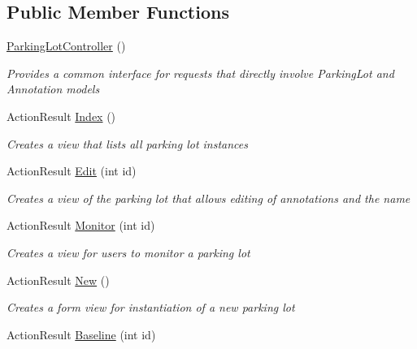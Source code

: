 \subsection*{Public Member Functions}
\begin{DoxyCompactItemize}
\item 
\mbox{\hyperlink{class_eagle_eye_1_1_controllers_1_1_parking_lot_controller_a6cb8c923ba943aca4683d60d1585806d}{Parking\+Lot\+Controller}} ()
\begin{DoxyCompactList}\small\item\em Provides a common interface for requests that directly involve Parking\+Lot and Annotation models \end{DoxyCompactList}\item 
Action\+Result \mbox{\hyperlink{class_eagle_eye_1_1_controllers_1_1_parking_lot_controller_a5015c903ed00613edaec0fed1c2d4847}{Index}} ()
\begin{DoxyCompactList}\small\item\em Creates a view that lists all parking lot instances \end{DoxyCompactList}\item 
Action\+Result \mbox{\hyperlink{class_eagle_eye_1_1_controllers_1_1_parking_lot_controller_a4c61e3d4b7e032a616e0624bf79fbba8}{Edit}} (int id)
\begin{DoxyCompactList}\small\item\em Creates a view of the parking lot that allows editing of annotations and the name \end{DoxyCompactList}\item 
Action\+Result \mbox{\hyperlink{class_eagle_eye_1_1_controllers_1_1_parking_lot_controller_a3e05e24a69a4c1c646c67003a00b632b}{Monitor}} (int id)
\begin{DoxyCompactList}\small\item\em Creates a view for users to monitor a parking lot \end{DoxyCompactList}\item 
Action\+Result \mbox{\hyperlink{class_eagle_eye_1_1_controllers_1_1_parking_lot_controller_a15e34fac7a5623494db6ac9ef11e7021}{New}} ()
\begin{DoxyCompactList}\small\item\em Creates a form view for instantiation of a new parking lot \end{DoxyCompactList}\item 
Action\+Result \mbox{\hyperlink{class_eagle_eye_1_1_controllers_1_1_parking_lot_controller_a2a8a2327d686b2b8aeb95bfd8f527326}{Baseline}} (int id)

\end{DoxyCompactItemize}
